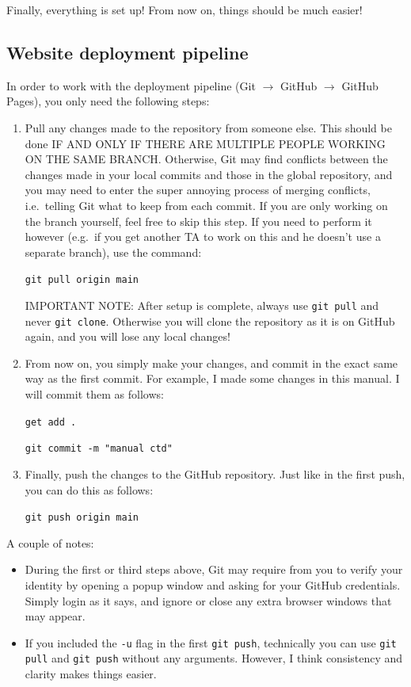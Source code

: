 \documentclass[a4paper,10pt]{article}
\begin{document}
Finally, everything is set up! From now on, things should be much easier! 

\subsection{Website deployment pipeline}

In order to work with the deployment pipeline (Git $\to$ GitHub $\to$ GitHub Pages), you only need the following steps: 
\begin{enumerate}
    \item Pull any changes made to the repository from someone else. This should be done IF AND ONLY IF THERE ARE MULTIPLE PEOPLE WORKING ON THE SAME BRANCH. Otherwise, Git may find conflicts between the changes made in your local commits and those in the global repository, and you may need to enter the super annoying process of merging conflicts, i.e.\ telling Git what to keep from each commit. If you are only working on the branch yourself, feel free to skip this step. If you need to perform it however (e.g.\ if you get another TA to work on this and he doesn't use a separate branch), use the command:

    \texttt{git pull origin main}

    IMPORTANT NOTE: After setup is complete, always use \texttt{git pull} and never \texttt{git clone}. Otherwise you will clone the repository as it is on GitHub again, and you will lose any local changes!  

    \item From now on, you simply make your changes, and commit in the exact same way as the first commit. For example, I made some changes in this manual. I will commit them as follows:

    \texttt{get add .}

    \texttt{git commit -m "manual ctd"}

    \item Finally, push the changes to the GitHub repository. Just like in the first push, you can do this as follows:

    \texttt{git push origin main}
\end{enumerate}
A couple of notes:
\begin{itemize}
    \item During the first or third steps above, Git may require from you to verify your identity by opening a popup window and asking for your GitHub credentials. Simply login as it says, and ignore or close any extra browser windows that may appear.
    \item If you included the \texttt{-u} flag in the first \texttt{git push}, technically you can use \texttt{git pull} and \texttt{git push} without any arguments. However, I think consistency and clarity makes things easier.
\end{itemize}
\end{document}
